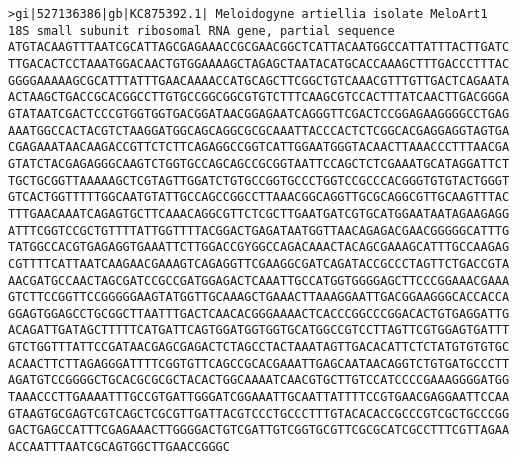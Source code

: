 \documentclass[11pt]{article}
\begin{document}
\begin{Verbatim}[commandchars=\\\{\}]
>gi|527136386|gb|KC875392.1| Meloidogyne artiellia isolate MeloArt1 18S small subunit ribosomal RNA gene, partial sequence
ATGTACAAGTTTAATCGCATTAGCGAGAAACCGCGAACGGCTCATTACAATGGCCATTATTTACTTGATC
TTGACACTCCTAAATGGACAACTGTGGAAAAGCTAGAGCTAATACATGCACCAAAGCTTTGACCCTTTAC
GGGGAAAAAGCGCATTTATTTGAACAAAACCATGCAGCTTCGGCTGTCAAACGTTTGTTGACTCAGAATA
ACTAAGCTGACCGCACGGCCTTGTGCCGGCGGCGTGTCTTTCAAGCGTCCACTTTATCAACTTGACGGGA
GTATAATCGACTCCCGTGGTGGTGACGGATAACGGAGAATCAGGGTTCGACTCCGGAGAAGGGGCCTGAG
AAATGGCCACTACGTCTAAGGATGGCAGCAGGCGCGCAAATTACCCACTCTCGGCACGAGGAGGTAGTGA
CGAGAAATAACAAGACCGTTCTCTTCAGAGGCCGGTCATTGGAATGGGTACAACTTAAACCCTTTAACGA
GTATCTACGAGAGGGCAAGTCTGGTGCCAGCAGCCGCGGTAATTCCAGCTCTCGAAATGCATAGGATTCT
TGCTGCGGTTAAAAAGCTCGTAGTTGGATCTGTGCCGGTGCCCTGGTCCGCCCACGGGTGTGTACTGGGT
GTCACTGGTTTTTGGCAATGTATTGCCAGCCGGCCTTAAACGGCAGGTTGCGCAGGCGTTGCAAGTTTAC
TTTGAACAAATCAGAGTGCTTCAAACAGGCGTTCTCGCTTGAATGATCGTGCATGGAATAATAGAAGAGG
ATTTCGGTCCGCTGTTTTATTGGTTTTACGGACTGAGATAATGGTTAACAGAGACGAACGGGGGCATTTG
TATGGCCACGTGAGAGGTGAAATTCTTGGACCGYGGCCAGACAAACTACAGCGAAAGCATTTGCCAAGAG
CGTTTTCATTAATCAAGAACGAAAGTCAGAGGTTCGAAGGCGATCAGATACCGCCCTAGTTCTGACCGTA
AACGATGCCAACTAGCGATCCGCCGATGGAGACTCAAATTGCCATGGTGGGGAGCTTCCCGGAAACGAAA
GTCTTCCGGTTCCGGGGGAAGTATGGTTGCAAAGCTGAAACTTAAAGGAATTGACGGAAGGGCACCACCA
GGAGTGGAGCCTGCGGCTTAATTTGACTCAACACGGGAAAACTCACCCGGCCCGGACACTGTGAGGATTG
ACAGATTGATAGCTTTTTCATGATTCAGTGGATGGTGGTGCATGGCCGTCCTTAGTTCGTGGAGTGATTT
GTCTGGTTTATTCCGATAACGAGCGAGACTCTAGCCTACTAAATAGTTGACACATTCTCTATGTGTGTGC
ACAACTTCTTAGAGGGATTTTCGGTGTTCAGCCGCACGAAATTGAGCAATAACAGGTCTGTGATGCCCTT
AGATGTCCGGGGCTGCACGCGCGCTACACTGGCAAAATCAACGTGCTTGTCCATCCCCGAAAGGGGATGG
TAAACCCTTGAAAATTTGCCGTGATTGGGATCGGAAATTGCAATTATTTTCCGTGAACGAGGAATTCCAA
GTAAGTGCGAGTCGTCAGCTCGCGTTGATTACGTCCCTGCCCTTTGTACACACCGCCCGTCGCTGCCCGG
GACTGAGCCATTTCGAGAAACTTGGGGACTGTCGATTGTCGGTGCGTTCGCGCATCGCCTTTCGTTAGAA
ACCAATTTAATCGCAGTGGCTTGAACCGGGC


\end{Verbatim}
\end{document}
